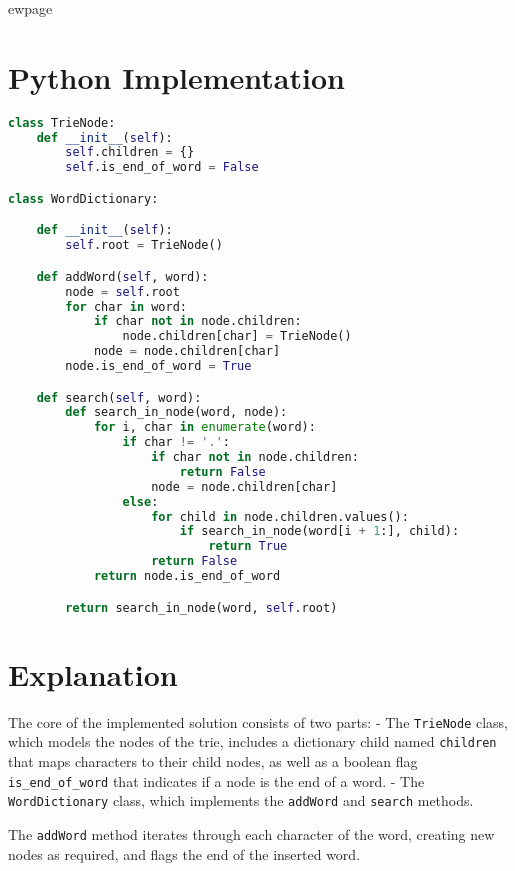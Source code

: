 ewpage 
\section*{Python Implementation}

\begin{fullwidth}
\begin{lstlisting}[language=Python]
class TrieNode:
    def __init__(self):
        self.children = {}
        self.is_end_of_word = False

class WordDictionary:

    def __init__(self):
        self.root = TrieNode()

    def addWord(self, word):
        node = self.root
        for char in word:
            if char not in node.children:
                node.children[char] = TrieNode()
            node = node.children[char]
        node.is_end_of_word = True

    def search(self, word):
        def search_in_node(word, node):
            for i, char in enumerate(word):
                if char != '.':
                    if char not in node.children:
                        return False
                    node = node.children[char]
                else:
                    for child in node.children.values():
                        if search_in_node(word[i + 1:], child):
                            return True
                    return False
            return node.is_end_of_word

        return search_in_node(word, self.root)
\end{lstlisting}

\end{fullwidth}

\section*{Explanation}
The core of the implemented solution consists of two parts:
- The \texttt{TrieNode} class, which models the nodes of the trie, includes a dictionary child named \texttt{children} that maps characters to their child nodes, as well as a boolean flag \texttt{is\_end\_of\_word} that indicates if a node is the end of a word.
- The \texttt{WordDictionary} class, which implements the \texttt{addWord} and \texttt{search} methods. 

The \texttt{addWord} method iterates through each character of the word, creating new nodes as required, and flags the end of the inserted word. 

